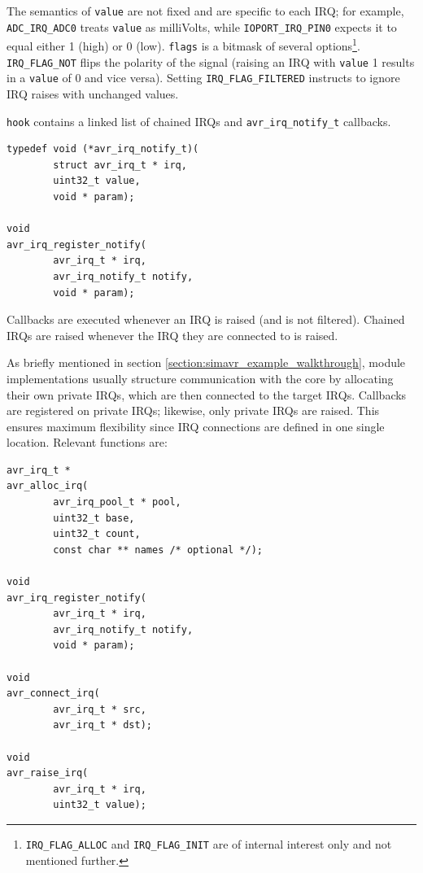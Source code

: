 The semantics of \lstinline|value| are not fixed and are specific to each \ac{IRQ};
for example, \lstinline|ADC_IRQ_ADC0| treats \lstinline|value| as milliVolts,
while \lstinline|IOPORT_IRQ_PIN0| expects it to equal either 1 (high) or 0 (low).
\lstinline|flags| is a bitmask of several options\footnote{
%
\lstinline|IRQ_FLAG_ALLOC| and \lstinline|IRQ_FLAG_INIT| are of internal interest
only and not mentioned further.
%
}.
\lstinline|IRQ_FLAG_NOT| flips
the polarity of the signal (raising an \ac{IRQ} with \lstinline|value| 1 results
in a \lstinline|value| of 0 and vice versa).
Setting \lstinline|IRQ_FLAG_FILTERED| instructs \simavr to ignore \ac{IRQ}
raises with unchanged values.

\lstinline|hook| contains a linked list of chained \acp{IRQ} and
\lstinline|avr_irq_notify_t| callbacks.

\begin{lstlisting}
typedef void (*avr_irq_notify_t)(
        struct avr_irq_t * irq,
        uint32_t value,
        void * param);

void
avr_irq_register_notify(
        avr_irq_t * irq,
        avr_irq_notify_t notify,
        void * param);
\end{lstlisting}

Callbacks are executed whenever an \ac{IRQ} is raised (and is not filtered).
Chained \acp{IRQ} are raised whenever the \ac{IRQ} they are connected to is raised.

As briefly mentioned in section \ref{section:simavr_example_walkthrough}, module
implementations usually structure communication with the \simavr core by
allocating their own private \acp{IRQ}, which are then connected to the target
\simavr \acp{IRQ}. Callbacks are registered on private \acp{IRQ};
likewise, only private \acp{IRQ} are raised. This
ensures maximum flexibility since \ac{IRQ} connections are defined in one single
location. Relevant functions are:

\begin{lstlisting}
avr_irq_t *
avr_alloc_irq(
        avr_irq_pool_t * pool,
        uint32_t base,
        uint32_t count,
        const char ** names /* optional */);

void
avr_irq_register_notify(
        avr_irq_t * irq,
        avr_irq_notify_t notify,
        void * param);

void
avr_connect_irq(
        avr_irq_t * src,
        avr_irq_t * dst);

void
avr_raise_irq(
        avr_irq_t * irq,
        uint32_t value);
\end{lstlisting}


